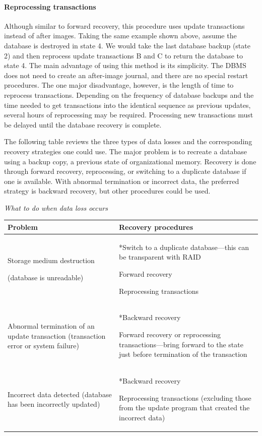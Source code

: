 \documentclass[
]{article}
\begin{document}
\hypertarget{reprocessing-transactions}{%
\paragraph*{Reprocessing transactions}\label{reprocessing-transactions}}

Although similar to forward recovery, this procedure uses update
transactions instead of after images. Taking the same example shown
above, assume the database is destroyed in state 4. We would take the
last database backup (state 2) and then reprocess update transactions B
and C to return the database to state 4. The main advantage of using
this method is its simplicity. The DBMS does not need to create an
after-image journal, and there are no special restart procedures. The
one major disadvantage, however, is the length of time to reprocess
transactions. Depending on the frequency of database backups and the
time needed to get transactions into the identical sequence as previous
updates, several hours of reprocessing may be required. Processing new
transactions must be delayed until the database recovery is complete.

The following table reviews the three types of data losses and the
corresponding recovery strategies one could use. The major problem is to
recreate a database using a backup copy, a previous state of
organizational memory. Recovery is done through forward recovery,
reprocessing, or switching to a duplicate database if one is available.
With abnormal termination or incorrect data, the preferred strategy is
backward recovery, but other procedures could be used.

\emph{What to do when data loss occurs}

\begin{longtable}[]{@{}
  >{\raggedright\arraybackslash}p{}
  >{\raggedright\arraybackslash}p{}@{}}
\toprule
Problem & Recovery procedures \\
\midrule
\endhead
Storage medium destruction

(database is unreadable) & *Switch to a duplicate
database---this can be
transparent with RAID

Forward recovery

Reprocessing transactions \\
Abnormal termination of an \textbar{}
update transaction (transaction
error or system failure) & *Backward recovery

Forward recovery or reprocessing
transactions---bring forward to
the state just before termination
of the transaction \\
Incorrect data detected (database
has been incorrectly updated) & *Backward recovery

Reprocessing transactions
(excluding those from the update
program that created the
incorrect data) \\
\bottomrule
\end{longtable}
\end{document}
